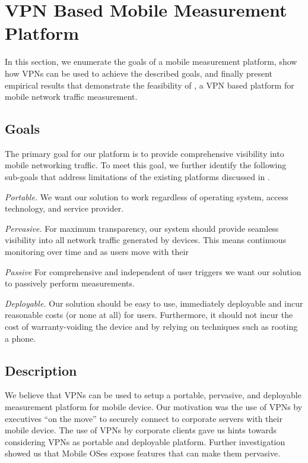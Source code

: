 \section{VPN Based Mobile Measurement Platform} 
\label{sec:platform} 
In this section, we enumerate the goals of a mobile measurement platform, show how VPNs can be used to achieve the described goals, and finally present empirical results that demonstrate the feasibility of \platname, a VPN based platform for mobile network traffic measurement.

\subsection{Goals}  
\label{sec:goals} 
The primary goal for our platform is to provide comprehensive visibility into mobile networking traffic. 
To meet this goal, we further identify the following sub-goals that address limitations of the existing platforms discussed in .
\begin{packedenumerate}
\item \emph{Portable.} We want our solution to work regardless of operating system, access technology, and service provider. 
\item \emph{Pervasive.} For maximum transparency, our system should provide seamless visibility into all network traffic generated by devices. 
This means continuous monitoring over time and as users move with their 
\item \emph{Passive} For comprehensive and independent of user triggers we want our solution to passively perform measurements. 
\item \emph{Deployable.} Our solution should be easy to use, immediately deployable and incur reasonable costs (or none at all) for users.
Furthermore, it should not incur the cost of warranty-voiding the device and by relying on techniques such as rooting a phone.
\end{packedenumerate}    

\subsection{Description}
\label{sec:description}

We believe that VPNs can be used to setup a portable, pervasive, and deployable measurement platform for mobile device. 
Our motivation was the use of VPNs by executives ``on the move'' to securely connect to corporate servers with their mobile device. 
The use of VPNs by corporate clients gave us hints towards considering VPNs as portable and deployable platform.
Further investigation showed us that Mobile OSes expose features that can make them pervasive.  


